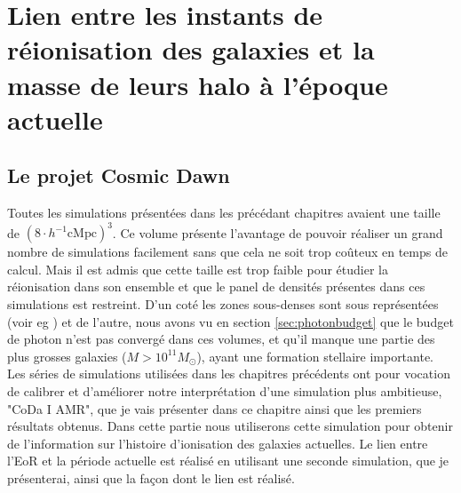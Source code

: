 \chapter[Réionisation et masse des halos à z=0]{Lien entre les instants de réionisation des galaxies et la masse de leurs halo à l'époque actuelle}
\label{sec:z0}

\section{Le projet Cosmic Dawn}
\label{sec:CODAEMMA}

Toutes les simulations présentées dans les précédant chapitres avaient une taille de $\left( 8\cdot h^{-1} \mathrm{cMpc} \right)^3$.
Ce volume présente l'avantage de pouvoir réaliser un grand nombre de simulations facilement sans que cela ne soit trop coûteux en temps de calcul.
Mais il est admis que cette taille est trop faible pour étudier la réionisation dans son ensemble et que le panel de densités présentes dans ces simulations est restreint.
D'un coté les zones sous-denses sont sous représentées  (voir eg \cite{iliev_simulating_2006}) et de l'autre, nous avons vu en section \ref{sec:photonbudget} que le budget de photon n'est pas convergé dans ces volumes, et qu'il manque une partie des plus grosses galaxies ($M>10^{11}M_\odot$), ayant une formation stellaire importante.
Les séries de simulations utilisées dans les chapitres précédents ont pour vocation de calibrer et d'améliorer notre interprétation d'une simulation plus ambitieuse, "CoDa I AMR", que je vais présenter dans ce chapitre ainsi que les premiers résultats obtenus.
Dans cette partie nous utiliserons cette simulation pour obtenir de l'information sur l'histoire d'ionisation des galaxies actuelles.
Le lien entre l'\ac{EoR} et la période actuelle est réalisé en utilisant une seconde simulation, que je présenterai, ainsi que la façon dont le lien est réalisé.



